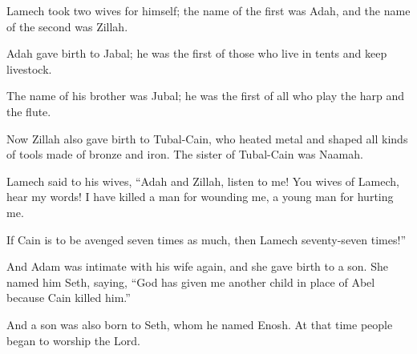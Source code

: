 \begin{scripture}
 Lamech took two wives for himself; the name of the first was Adah, and the name of the second was Zillah.
 Adah gave birth to Jabal; he was the first of those who live in tents and keep livestock.
 The name of his brother was Jubal; he was the first of all who play the harp and the flute.
 Now Zillah also gave birth to Tubal-Cain, who heated metal and shaped all kinds of tools made of bronze and iron. The sister of Tubal-Cain was Naamah.
\everypar{}

 Lamech said to his wives, ``Adah and Zillah, listen to me! You wives of Lamech, hear my words! I have killed a man for wounding me, a young man for hurting me.
\everypar{}

 If Cain is to be avenged seven times as much, then Lamech seventy-seven times!''
\everypar{}

 And Adam was intimate with his wife again, and she gave birth to a son. She named him Seth, saying, ``God has given me another child in place of Abel because Cain killed him.''
 And a son was also born to Seth, whom he named Enosh. At that time people began to worship the Lord.


\end{scripture}
